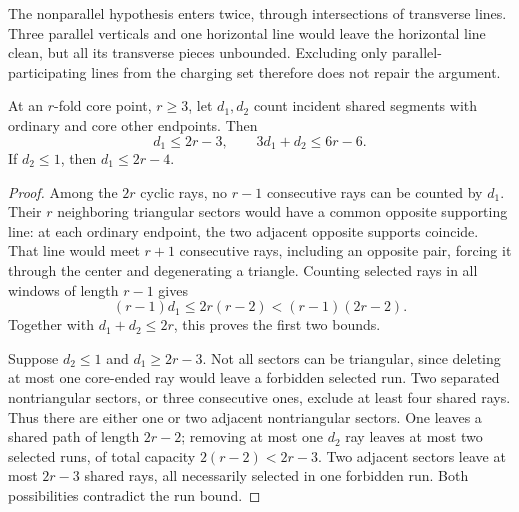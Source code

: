 The nonparallel hypothesis enters twice, through intersections of transverse lines. Three parallel verticals and one horizontal line would leave the horizontal line clean, but all its transverse pieces unbounded. Excluding only parallel-participating lines from the charging set therefore does not repair the argument.

\begin{lemma}
\label{jup:fan}
At an $r$-fold core point, $r\ge3$, let $d_1,d_2$ count incident shared segments with ordinary and core other endpoints. Then
\[
 d_1\le2r-3,\qquad 3d_1+d_2\le6r-6.
\]
If $d_2\le1$, then $d_1\le2r-4$.
\end{lemma}
\begin{proof}
Among the $2r$ cyclic rays, no $r-1$ consecutive rays can be counted by $d_1$. Their $r$ neighboring triangular sectors would have a common opposite supporting line: at each ordinary endpoint, the two adjacent opposite supports coincide. That line would meet $r+1$ consecutive rays, including an opposite pair, forcing it through the center and degenerating a triangle. Counting selected rays in all windows of length $r-1$ gives
\[
 (r-1)d_1\le2r(r-2)<(r-1)(2r-2).
\]
Together with $d_1+d_2\le2r$, this proves the first two bounds.

Suppose $d_2\le1$ and $d_1\ge2r-3$. Not all sectors can be triangular, since deleting at most one core-ended ray would leave a forbidden selected run. Two separated nontriangular sectors, or three consecutive ones, exclude at least four shared rays. Thus there are either one or two adjacent nontriangular sectors. One leaves a shared path of length $2r-2$; removing at most one $d_2$ ray leaves at most two selected runs, of total capacity $2(r-2)<2r-3$. Two adjacent sectors leave at most $2r-3$ shared rays, all necessarily selected in one forbidden run. Both possibilities contradict the run bound.
\end{proof}

